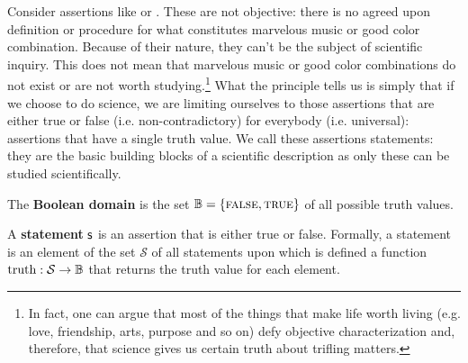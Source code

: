 \documentclass[11pt,letterpaper,fleqn]{memoir} %
\begin{document}
Consider assertions like  or . These are not objective: there is no agreed upon definition or procedure for what constitutes marvelous music or good color combination. Because of their nature, they can't be the subject of scientific inquiry. This does not mean that marvelous music or good color combinations do not exist or are not worth studying.\footnote{In fact, one can argue that most of the things that make life worth living (e.g. love, friendship, arts, purpose and so on) defy objective characterization and, therefore, that science gives us certain truth about trifling matters.} What the principle tells us is simply that if we choose to do science, we are limiting ourselves to those assertions that are either true or false (i.e. non-contradictory) for everybody (i.e. universal): assertions that have a single truth value. We call these assertions statements: they are the basic building blocks of a scientific description as only these can be studied scientifically.

\begin{mathSection}
\begin{defn}
	The \textbf{Boolean domain} is the set $\mathbb{B} = \{\textsc{false}, \textsc{true}\}$ of all possible truth values.
\end{defn}


\begin{axiom}\label{ax_statement}
	A \textbf{statement} $\mathsf{s}$ is an assertion that is either true or false. Formally, a statement is an element of the set $\mathcal{S}$ of all statements upon which is defined a function $\operatorname{truth}: \mathcal{S} \to \mathbb{B}$ that returns the truth value for each element.
\end{axiom}

\end{mathSection}
\end{document}
